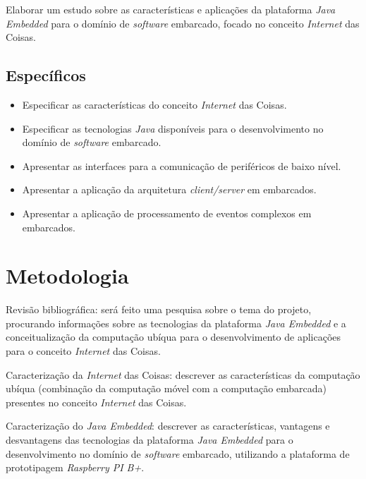 Elaborar um estudo sobre as características e aplicações da plataforma \textit{Java Embedded} para o domínio de \textit{software} embarcado, focado no conceito \textit{Internet} das Coisas.

\newpage
\subsection{Específicos}

\begin{itemize}
    
	\item Especificar as características do conceito \textit{Internet} das Coisas.
	
    \item Especificar as tecnologias \textit{Java} disponíveis para o 
    desenvolvimento no domínio de \textit{software} embarcado.
	
    \item Apresentar as interfaces para a comunicação de periféricos de baixo 
    nível.
	
    \item Apresentar a aplicação da arquitetura \textit{client/server} em 
    embarcados.
	
    \item Apresentar a aplicação de processamento de eventos complexos em 
    embarcados.
    
\end{itemize}

\section{Metodologia}

Revisão bibliográfica: será feito uma pesquisa sobre o tema do projeto, 
procurando informações sobre as tecnologias da plataforma \textit{Java 
Embedded} e a conceitualização da computação ubíqua para o desenvolvimento de 
aplicações para o conceito \textit{Internet} das Coisas.

Caracterização da \textit{Internet} das Coisas: descrever as características  da computação ubíqua (combinação da computação móvel com a computação embarcada) presentes no conceito \textit{Internet} das Coisas.

Caracterização do \textit{Java Embedded}: descrever as características, vantagens e desvantagens das tecnologias da plataforma \textit{Java Embedded} para o desenvolvimento no domínio de \textit{software} embarcado, utilizando a plataforma de prototipagem \textit{Raspberry PI B+}.

